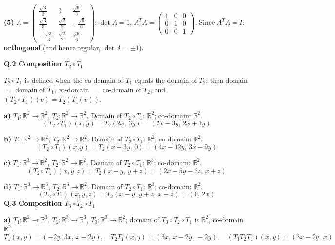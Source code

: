 \noindent\textbf{(5)} $A=\begin{pmatrix}\frac{\sqrt{3}}{3} & 0 & \frac{\sqrt{6}}{3} \\ \frac{\sqrt{3}}{3} & \frac{\sqrt{2}}{2} & - \frac{\sqrt{6}}{6} \\ - \frac{\sqrt{3}}{3} & \frac{\sqrt{2}}{2} & \frac{\sqrt{6}}{6}\end{pmatrix}$: $\det A=1$, $A^TA=\begin{pmatrix}1 & 0 & 0 \\ 0 & 1 & 0 \\ 0 & 0 & 1\end{pmatrix}$. Since $A^TA=I$: \textbf{orthogonal} (and hence regular, $\det A=\pm1$).

\medskip\noindent\textbf{Q.2  Composition $T_2\circ T_1$}\par\smallskip
$T_2\circ T_1$ is defined when the co-domain of $T_1$ equals the domain of $T_2$; then domain $=$ domain of $T_1$, co-domain $=$ co-domain of $T_2$, and $(T_2\circ T_1)(v)=T_2(T_1(v))$.

\noindent\textbf{a)} $T_1:\mathbb{R}^2\to\mathbb{R}^2$, $T_2:\mathbb{R}^2\to\mathbb{R}^2$. Domain of $T_2\circ T_1$: $\mathbb{R}^2$; co-domain: $\mathbb{R}^2$.
\[ (T_2\circ T_1)(x,y)=T_2(2 x,\,3 y)=(2 x - 3 y,\,2 x + 3 y) \]

\noindent\textbf{b)} $T_1:\mathbb{R}^2\to\mathbb{R}^2$, $T_2:\mathbb{R}^2\to\mathbb{R}^2$. Domain of $T_2\circ T_1$: $\mathbb{R}^2$; co-domain: $\mathbb{R}^2$.
\[ (T_2\circ T_1)(x,y)=T_2(x - 3 y,\,0)=(4 x - 12 y,\,3 x - 9 y) \]

\noindent\textbf{c)} $T_1:\mathbb{R}^3\to\mathbb{R}^2$, $T_2:\mathbb{R}^2\to\mathbb{R}^2$. Domain of $T_2\circ T_1$: $\mathbb{R}^3$; co-domain: $\mathbb{R}^2$.
\[ (T_2\circ T_1)(x,y,z)=T_2(x - y,\,y + z)=(2 x - 5 y - 3 z,\,x + z) \]

\noindent\textbf{d)} $T_1:\mathbb{R}^3\to\mathbb{R}^3$, $T_2:\mathbb{R}^3\to\mathbb{R}^2$. Domain of $T_2\circ T_1$: $\mathbb{R}^3$; co-domain: $\mathbb{R}^2$.
\[ (T_2\circ T_1)(x,y,z)=T_2(x - y,\,y + z,\,x - z)=(0,\,2 x) \]
\medskip\noindent\textbf{Q.3  Composition $T_3\circ T_2\circ T_1$}\par\smallskip

\noindent\textbf{a)} $T_1:\mathbb{R}^2\to\mathbb{R}^3$, $T_2:\mathbb{R}^3\to\mathbb{R}^3$, $T_3:\mathbb{R}^3\to\mathbb{R}^2$; domain of $T_3\circ T_2\circ T_1$ is $\mathbb{R}^2$, co-domain $\mathbb{R}^2$.
\[ T_1(x,y)=(- 2 y,\,3 x,\,x - 2 y),\quad T_2T_1(x,y)=(3 x,\,x - 2 y,\,- 2 y),\quad (T_3T_2T_1)(x,y)=(3 x - 2 y,\,x) \]

